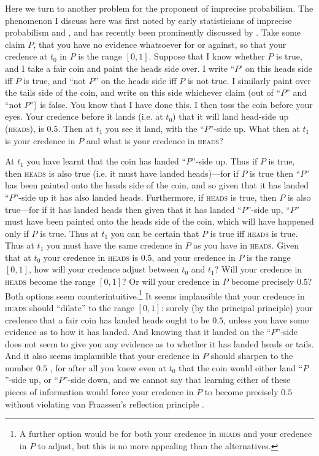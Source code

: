 Here we turn to another problem for the proponent of imprecise probabilism. The phenomenon I discuss here was first noted by early statisticians of imprecise probabilism \citet{walley1991} and \citet{SeidenfeldWasserman1993}, and has recently been prominently discussed by \citet{White2009}. Take some claim $P$, that you have no evidence whatsoever for or against, so that your credence at $t_0$ in $P$ is the range $[0,1]$. Suppose that I know whether $P$ is true, and I take a fair coin and paint the heads side over. I write ``$P$' on this heads side iff $P$ is true, and ``not $P$'' on the heads side iff $P$ is not true. I similarly paint over the tails side of the coin, and write on this side whichever claim (out of ``$P$'' and ``not $P$'') is false. You know that I have done this. I then toss the coin before your eyes. Your credence before it lands (i.e. at $t_0$) that it will land head-side up (\textsc{heads}), is $0.5$. Then at $t_1$ you see it land, with the ``$P$''-side up. What then at $t_1$ is your credence in $P$ and what is your credence in \textsc{heads}?

At $t_1$ you have learnt that the coin has landed ``$P$''-side up. Thus if $P$ is true, then \textsc{heads} is also true (i.e. it must have landed heads)---for if $P$ is true then ``$P$'' has been painted onto the heads side of the coin, and so given that it has landed ``$P$''-side up it has also landed heads. Furthermore, if \textsc{heads} is true, then $P$ is also true---for if it has landed heads then given that it has landed ``$P$''-side up, ``$P$'' must have been painted onto the heads side of the coin, which will have happened only if $P$ is true. Thus at $t_1$ you can be certain that $P$ is true iff \textsc{heads} is true. Thus  at $t_1$ you must have the same credence in $P$ as you have in \textsc{heads}. Given that at $t_0$ your credence in \textsc{heads} is $0.5$, and your credence in $P$ is the range $[0,1]$, how will your credence adjust between $t_0$ and $t_1$? Will your credence in \textsc{heads} become the range $[0,1]$? Or will your credence in $P$ become precisely $0.5$? Both options seem counterintuitive.\footnote{A further option would be for both your credence in \textsc{heads} and your credence in $P$ to adjust, but this is no more appealing than the alternatives.} It seems implausible that your credence in \textsc{heads} should ``dilate'' to the range $[0,1]$: surely (by the principal principle) your credence that a fair coin has landed heads ought to be $0.5$, unless you have some evidence as to how it has landed. And knowing that it landed on the ``$P$''-side does not seem to give you any evidence as to whether it has landed heads or tails. And it also seems implausible that your credence in $P$ should sharpen to the number $0.5$ \citep{White2009}, for after all you knew even at $t_0$ that the coin would either land ``$P$''-side up, or ``$P$''-side down, and we cannot say that learning either of these pieces of information would force your credence in $P$ to become precisely $0.5$ without violating van Fraassen's reflection principle \citep{fraassen1984}. 

